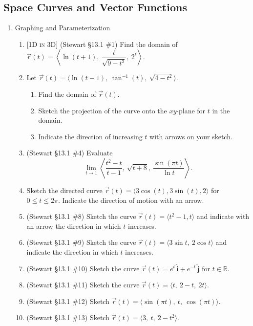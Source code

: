 \documentclass[12pt]{article}
\newcommand{\ihat}{\hat{\textbf{i}}}
\newcommand{\jhat}{\hat{\textbf{j}}}
\newcommand{\dimtag}[1]{{\footnotesize\textsc{[#1]}}\;}
\newcounter{topic}
\begin{document}
\subsection*{Space Curves and Vector Functions}
\begin{enumerate}\setcounter{enumi}{\value{topic}}

\item Graphing and Parameterization
    \begin{enumerate}
        \item \dimtag{1D in 3D} (Stewart \S13.1 \#1) Find the domain of $\vec{r}(t) = \left\langle \ln(t+1),\ \dfrac{t}{\sqrt{9-t^2}},\ 2^t \right\rangle$.
        \item Let $\vec{r}(t) = \langle \ln(t-1),\ \tan^{-1}(t),\ \sqrt{4 - t^2} \rangle$.
        \begin{enumerate}
            \item Find the domain of $\vec{r}(t)$.
            \item Sketch the projection of the curve onto the $xy$-plane for $t$ in the domain.
            \item Indicate the direction of increasing $t$ with arrows on your sketch.
        \end{enumerate}
        \item (Stewart \S13.1 \#4) Evaluate
        \[ \lim_{t\to 1} \left\langle \frac{t^2-t}{t-1},\ \sqrt{t+8},\ \frac{\sin(\pi t)}{\ln t} \right\rangle. \]
        \item Sketch the directed curve $\vec{r}(t) = \langle 3\cos(t), 3\sin(t), 2 \rangle$ for $0 \leq t \leq 2\pi$. Indicate the direction of motion with an arrow.
        \item (Stewart \S13.1 \#8) Sketch the curve $\vec r(t) = \langle t^2 - 1, t\rangle$ and indicate with an arrow the direction in which $t$ increases.
        \item (Stewart \S13.1 \#9) Sketch the curve $\vec r(t) = \langle 3\sin t,\ 2\cos t\rangle$ and indicate the direction in which $t$ increases.
        \item (Stewart \S13.1 \#10) Sketch the curve $\vec r(t) = e^t\,\ihat + e^{-t}\,\jhat$ for $t\in\mathbb{R}$.
        \item (Stewart \S13.1 \#11) Sketch the curve $\vec r(t) = \langle t,\ 2-t,\ 2t\rangle$.
        \item (Stewart \S13.1 \#12) Sketch $\vec r(t) = \langle \sin(\pi t),\ t,\ \cos(\pi t)\rangle$.
        \item (Stewart \S13.1 \#13) Sketch $\vec r(t) = \langle 3,\ t,\ 2 - t^2 \rangle$.

\end{enumerate}
\end{enumerate}
\end{document}
